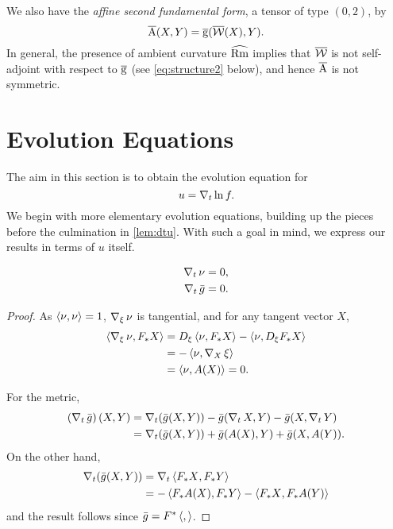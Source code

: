 \documentclass{amsart}
\begin{document}
We also have the \emph{affine second fundamental form}, a tensor of type $(0, 2)$, by
\[
\affsff (X, Y) = \affg(\affshape(X), Y).
\]
In general, the presence of ambient curvature $\bgRm$ implies that $\affshape$ is not self-adjoint with respect to $\affg$ (see \eqref{eq:structure2} below), and hence $\affsff$ is not symmetric.

\section{Evolution Equations}


The aim in this section is to obtain the evolution equation for
\[
u = \D_t \ln f.
\]
We begin with more elementary evolution equations, building up the pieces before the culmination in \cref{lem:dtu}. With such a goal in mind, we express our results in terms of $u$ itself.

\begin{lemma}
\label{lem:gaussmap}
\begin{align}
\D_t \nor & = 0, \\
\D_t \bar{g} &= 0.
\end{align}
\end{lemma}

\begin{proof}
As $\ip{\nor}{\nor} = 1$, $\D_{\vel} \nor$ is tangential, and for any tangent vector $X$,
\[
\begin{split}
\ip{\D_{\vel} \nor}{F_{\ast} X} &= D_{\vel} \ip{\nor}{F_{\ast}X} - \ip{\nor}{D_{\vel} F_{\ast} X} \\
&= -\ip{\nor}{\D_{X}\vel} \\
&= \ip{\nor}{A(X)} = 0.
\end{split}
\]

For the metric,
\[
\begin{split}
\left(\D_t \bar{g}\right) (X, Y) &= \D_t (\bar{g}(X, Y)) - \bar{g}(\D_t X, Y) - \bar{g}(X, \D_t Y) \\
&= \D_t (\bar{g}(X, Y)) + \bar{g}(A(X), Y) + \bar{g}(X, A(Y)).
\end{split}
\]
On the other hand,
\[
\begin{split}
\D_t (\bar{g}(X, Y)) &= \D_t \ip{F_{\ast} X}{F_{\ast} Y} \\
&= -\ip{F_{\ast} A(X)}{F_{\ast} Y} - \ip{F_{\ast} X}{F_{\ast} A(Y)}
\end{split}
\]
and the result follows since $\bar{g} = F^{\ast} \ip{}{}$.
\end{proof}
\end{document}

